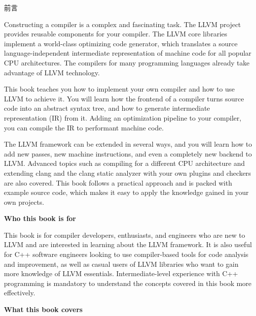 \begin{flushright}
	 前言
\end{flushright}

Constructing a compiler is a complex and fascinating task. The LLVM project provides reusable components for your compiler. The LLVM core libraries implement a world-class optimizing code generator, which translates a source language-independent intermediate representation of machine code for all popular CPU architectures. The compilers for many programming languages already take advantage of LLVM technology.\par

This book teaches you how to implement your own compiler and how to use LLVM
to achieve it. You will learn how the frontend of a compiler turns source code into an abstract syntax tree, and how to generate intermediate representation (IR) from it. Adding an optimization pipeline to your compiler, you can compile the IR to performant machine code.\par

The LLVM framework can be extended in several ways, and you will learn how to add new passes, new machine instructions, and even a completely new backend to LLVM. Advanced topics such as compiling for a different CPU architecture and extending clang and the clang static analyzer with your own plugins and checkers are also covered. This book follows a practical approach and is packed with example source code, which makes it easy to apply the knowledge gained in your own projects.\par

\hspace*{\fill} \par %
\textbf{Who this book is for}

This book is for compiler developers, enthusiasts, and engineers who are new to LLVM and are interested in learning about the LLVM framework. It is also useful for C++ software engineers looking to use compiler-based tools for code analysis and improvement, as well as casual users of LLVM libraries who want to gain more knowledge of LLVM essentials. Intermediate-level experience with C++ programming is mandatory to understand the concepts covered in this book more effectively.\par

\hspace*{\fill} \par %
\textbf{What this book covers}

